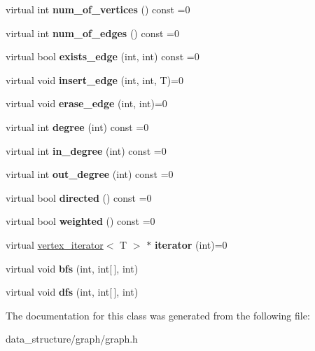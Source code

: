 \begin{DoxyCompactItemize}
\item 
\mbox{\label{classgraph_a09d38d3a6517294b919153d8040e6ec3}} 
virtual int {\bfseries num\+\_\+of\+\_\+vertices} () const =0
\item 
\mbox{\label{classgraph_a3c5db2574a9a7ddfd44e8f2f5c4d713e}} 
virtual int {\bfseries num\+\_\+of\+\_\+edges} () const =0
\item 
\mbox{\label{classgraph_a252a14b0bf9b10bcfdfec83df07c60b5}} 
virtual bool {\bfseries exists\+\_\+edge} (int, int) const =0
\item 
\mbox{\label{classgraph_aa9e0efd15c95887ec7d9a82bf36e1704}} 
virtual void {\bfseries insert\+\_\+edge} (int, int, T)=0
\item 
\mbox{\label{classgraph_ad0d12d6f8e6e2881e7d5f5ed732acc8a}} 
virtual void {\bfseries erase\+\_\+edge} (int, int)=0
\item 
\mbox{\label{classgraph_a3ac37382a706f5ad8a76a4f3439843b3}} 
virtual int {\bfseries degree} (int) const =0
\item 
\mbox{\label{classgraph_a9f37d81c0bbbd854e55e5a83f98871d4}} 
virtual int {\bfseries in\+\_\+degree} (int) const =0
\item 
\mbox{\label{classgraph_aceb953196b3fc06e3eda715311c70542}} 
virtual int {\bfseries out\+\_\+degree} (int) const =0
\item 
\mbox{\label{classgraph_a583ec6a74dd86daea97410ebeb7e7989}} 
virtual bool {\bfseries directed} () const =0
\item 
\mbox{\label{classgraph_ab84679f42eca64f8395b331ed27cdf14}} 
virtual bool {\bfseries weighted} () const =0
\item 
\mbox{\label{classgraph_a187b0c9dac2d5b3d7d2c21b4f80047c8}} 
virtual \hyperlink{classvertex__iterator}{vertex\+\_\+iterator}$<$ T $>$ $\ast$ {\bfseries iterator} (int)=0
\item 
\mbox{\label{classgraph_a2b8224ad27463b099c4b21b090a8a468}} 
virtual void {\bfseries bfs} (int, int\mbox{[}$\,$\mbox{]}, int)
\item 
\mbox{\label{classgraph_a7c2a8cef100e1f3721405ec3a0c143d5}} 
virtual void {\bfseries dfs} (int, int\mbox{[}$\,$\mbox{]}, int)
\end{DoxyCompactItemize}


The documentation for this class was generated from the following file\+:\begin{DoxyCompactItemize}
\item 
data\+\_\+structure/graph/graph.\+h\end{DoxyCompactItemize}
